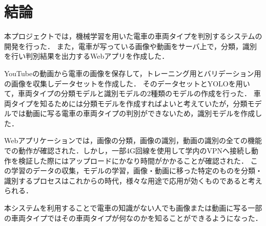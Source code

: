 

\chapter{結論}\label{conclusion}
本プロジェクトでは，機械学習を用いた電車の車両タイプを判別するシステムの開発を行った．
また，電車が写っている画像や動画をサーバ上で，分類，識別を行い判別結果を出力するWebアプリを作成した．

YouTubeの動画から電車の画像を保存して，トレーニング用とバリデーション用の画像を収集しデータセットを作成した．
そのデータセットとYOLOを用いて，車両タイプの分類モデルと識別モデルの2種類のモデルの作成を行った．
車両タイプを知るためには分類モデルを作成すればよいと考えていたが，分類モデルでは動画に写る電車の車両タイプの判別ができないため，識別モデルを作成した．


Webアプリケーションでは，画像の分類，画像の識別，動画の識別の全ての機能での動作が確認された．しかし，一部4G回線を使用して学内のVPNへ接続し動作を検証した際にはアップロードにかなり時間がかかることが確認された．
この学習のデータの収集，モデルの学習，画像・動画に移った特定のものを分類・識別するプロセスはこれからの時代，様々な用途で応用が効くものであると考えられる．

本システムを利用することで電車の知識がない人でも画像または動画に写る一部の車両タイプではその車両タイプが何なのかを知ることができるようになった．
